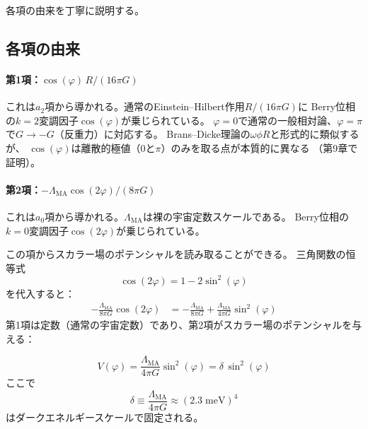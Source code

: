 \noindent
各項の由来を丁寧に説明する。

\subsection{各項の由来}

\paragraph{第1項：$\cos(\varphi)\, R / (16\pi G)$}

これは$a_2$項から導かれる。通常のEinstein--Hilbert作用$R/(16\pi G)$に
Berry位相の$k=2$変調因子$\cos(\varphi)$が乗じられている。
$\varphi=0$で通常の一般相対論、$\varphi=\pi$で$G\to -G$（反重力）に対応する。
Brans--Dicke理論の$\omega\phi R$と形式的に類似するが、
$\cos(\varphi)$は離散的極値（$0$と$\pi$）のみを取る点が本質的に異なる
（第9章で証明）。

\paragraph{第2項：$-\Lambda_{\mathrm{MA}}\cos(2\varphi) / (8\pi G)$}

これは$a_0$項から導かれる。$\Lambda_{\mathrm{MA}}$は裸の宇宙定数スケールである。
Berry位相の$k=0$変調因子$\cos(2\varphi)$が乗じられている。

この項からスカラー場のポテンシャルを読み取ることができる。
三角関数の恒等式
\begin{equation}
\cos(2\varphi) = 1 - 2\sin^2(\varphi)
\end{equation}
を代入すると：
\begin{align}
-\frac{\Lambda_{\mathrm{MA}}}{8\pi G}\cos(2\varphi)
&= -\frac{\Lambda_{\mathrm{MA}}}{8\pi G}
  + \frac{\Lambda_{\mathrm{MA}}}{4\pi G}\sin^2(\varphi)
\end{align}
第1項は定数（通常の宇宙定数）であり、第2項がスカラー場のポテンシャルを与える：

\begin{keyresult}[ポテンシャルの導出]
\begin{equation}
V(\varphi) = \frac{\Lambda_{\mathrm{MA}}}{4\pi G}\sin^2(\varphi)
  = \delta\,\sin^2(\varphi)
\label{eq:potential}
\end{equation}
ここで
\begin{equation}
\delta \equiv \frac{\Lambda_{\mathrm{MA}}}{4\pi G}
  \approx (2.3\;\mathrm{meV})^4
\label{eq:delta-scale}
\end{equation}
はダークエネルギースケールで固定される。
\end{keyresult}


